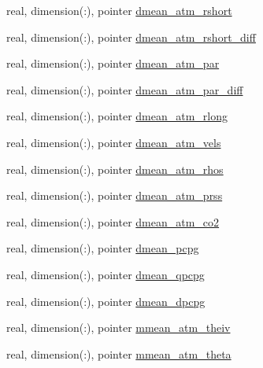 \begin{DoxyCompactItemize}
\item 
real, dimension(\+:), pointer \hyperlink{structed__state__vars_1_1polygontype_af57e0dfa63a74e00583a62db371884b0}{dmean\+\_\+atm\+\_\+rshort}
\item 
real, dimension(\+:), pointer \hyperlink{structed__state__vars_1_1polygontype_ad95cf4c0bae677989448168b8d389a92}{dmean\+\_\+atm\+\_\+rshort\+\_\+diff}
\item 
real, dimension(\+:), pointer \hyperlink{structed__state__vars_1_1polygontype_a5161f30c50975b0746a0102ce2ad23e3}{dmean\+\_\+atm\+\_\+par}
\item 
real, dimension(\+:), pointer \hyperlink{structed__state__vars_1_1polygontype_a89708255426c850083d0be1bcd2aa9d3}{dmean\+\_\+atm\+\_\+par\+\_\+diff}
\item 
real, dimension(\+:), pointer \hyperlink{structed__state__vars_1_1polygontype_a348c7c198f4abad350b50cbe9c44c5e3}{dmean\+\_\+atm\+\_\+rlong}
\item 
real, dimension(\+:), pointer \hyperlink{structed__state__vars_1_1polygontype_aa9ea15d4dbde79b829f925aeb40e3ef6}{dmean\+\_\+atm\+\_\+vels}
\item 
real, dimension(\+:), pointer \hyperlink{structed__state__vars_1_1polygontype_a5ddb3f5280c7b0e2fe5c38cd920678a2}{dmean\+\_\+atm\+\_\+rhos}
\item 
real, dimension(\+:), pointer \hyperlink{structed__state__vars_1_1polygontype_a02e80990f4dbb8179189bb000a5b53ab}{dmean\+\_\+atm\+\_\+prss}
\item 
real, dimension(\+:), pointer \hyperlink{structed__state__vars_1_1polygontype_a09fc03a574f8dd26664cd87c4d0150cc}{dmean\+\_\+atm\+\_\+co2}
\item 
real, dimension(\+:), pointer \hyperlink{structed__state__vars_1_1polygontype_a0db324b05185453755689a84bd63c07d}{dmean\+\_\+pcpg}
\item 
real, dimension(\+:), pointer \hyperlink{structed__state__vars_1_1polygontype_a5adff08cc3a4c16603db1a3c3e2b4a43}{dmean\+\_\+qpcpg}
\item 
real, dimension(\+:), pointer \hyperlink{structed__state__vars_1_1polygontype_ae5637f390ae76c91343c04ac4c2e082b}{dmean\+\_\+dpcpg}
\item 
real, dimension(\+:), pointer \hyperlink{structed__state__vars_1_1polygontype_adb04f269312bd1213bc16d848fe0742a}{mmean\+\_\+atm\+\_\+theiv}
\item 
real, dimension(\+:), pointer \hyperlink{structed__state__vars_1_1polygontype_aae9c9502fdd15889ed5ecb417bc0bbfd}{mmean\+\_\+atm\+\_\+theta}

\end{DoxyCompactItemize}
